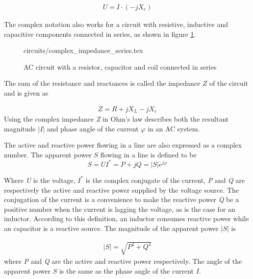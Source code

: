 \documentclass[class=book, crop=false]{standalone}
\begin{document}
\begin{equation}
   \begin{aligned}\label{eq:theory:complex_rectance_inductance}
U = I\cdot (-jX_{c})
\end{aligned} 
\end{equation}

The complex notation also works for a circuit with resistive, inductive and capacitive components connected in series, as shown in figure \ref{fig:theory:complex_impedance_series}.

\begin{figure}[ht!]
    \center
    {circuits/complex_impedance_series.tex}
    \caption[size = 9]
    {AC circuit with a resistor, capacitor and coil connected in series}\label{fig:theory:complex_impedance_series}
\end{figure}

The sum of the resistance and reactances is called the impedance $Z$ of the circuit and is given as

\begin{equation}
   \begin{aligned}\label{eq:theory:complex_impedance}
Z = R + jX_{L} - jX_{c}
\end{aligned} 
\end{equation}
Using the complex impedance \textit{Z} in Ohm's law describes both the resultant magnitude $|I|$ and phase angle of the current $\varphi$ in an AC system.

The active and reactive power flowing in a line are also expressed as a complex number. The apparent power $S$ flowing in a line is defined to be
\begin{equation}\label{eq:theory_apparent_power}
    S  = UI^{*} = P + jQ = |S|e^{j\varphi}
\end{equation}

Where \textit{U} is the voltage, $I^{*}$ is the complex conjugate of the current, \textit{P} and \textit{Q} are respectively  the active and reactive power supplied by the voltage source. The conjugation of the current is a convenience to make the reactive power \textit{Q} be a positive number when the current is lagging the voltage, as is the case for an inductor. According to this definition, an inductor consumes reactive power while an capacitor is a reactive source. The magnitude of the apparent power $|S|$ is

\begin{equation}
   \begin{aligned}\label{eq:theory:pythagoras_power}
|S| = \sqrt{P^{2} + Q^{2}}
\end{aligned} 
\end{equation}
where \textit{P} and \textit{Q} are the active and reactive power respectively. The angle of the apparent power $S$ is the same as the phase angle of the current $I$. 
\end{document}
